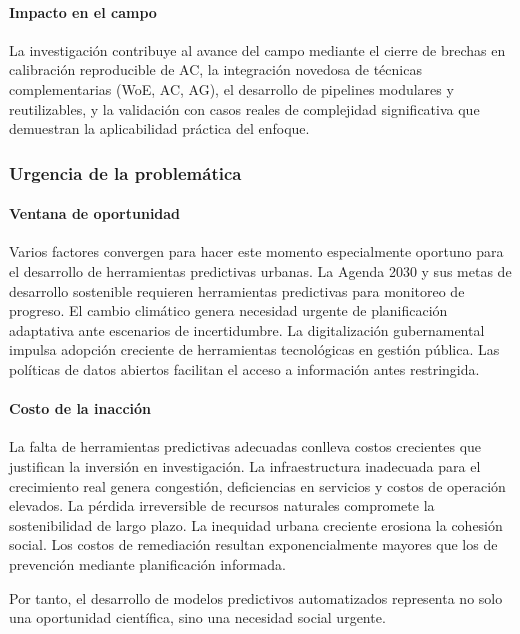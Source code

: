 \paragraph{Impacto en el campo}

La investigación contribuye al avance del campo mediante el cierre de brechas en calibración reproducible de AC, la integración novedosa de técnicas complementarias (WoE, AC, AG), el desarrollo de pipelines modulares y reutilizables, y la validación con casos reales de complejidad significativa que demuestran la aplicabilidad práctica del enfoque.

\subsubsection{Urgencia de la problemática}

\paragraph{Ventana de oportunidad}

Varios factores convergen para hacer este momento especialmente oportuno para el desarrollo de herramientas predictivas urbanas. La Agenda 2030 y sus metas de desarrollo sostenible requieren herramientas predictivas para monitoreo de progreso. El cambio climático genera necesidad urgente de planificación adaptativa ante escenarios de incertidumbre. La digitalización gubernamental impulsa adopción creciente de herramientas tecnológicas en gestión pública. Las políticas de datos abiertos facilitan el acceso a información antes restringida.

\paragraph{Costo de la inacción}

La falta de herramientas predictivas adecuadas conlleva costos crecientes que justifican la inversión en investigación. La infraestructura inadecuada para el crecimiento real genera congestión, deficiencias en servicios y costos de operación elevados. La pérdida irreversible de recursos naturales compromete la sostenibilidad de largo plazo. La inequidad urbana creciente erosiona la cohesión social. Los costos de remediación resultan exponencialmente mayores que los de prevención mediante planificación informada.

Por tanto, el desarrollo de modelos predictivos automatizados representa no solo una oportunidad científica, sino una necesidad social urgente.

